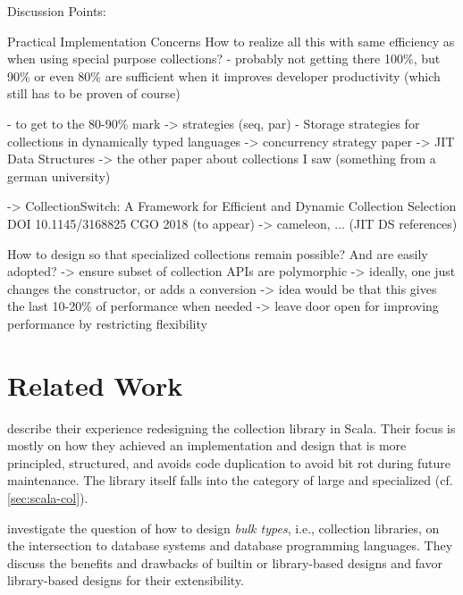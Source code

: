 \documentclass[sigconf, 10pt]{acmart}
\begin{document}
\begin{note}
Discussion Points:
 


Practical Implementation Concerns
 How to realize all this with same efficiency as when using special purpose
 collections?
 - probably not getting there 100\%, but 90\% or even 80\% are sufficient
   when it improves developer productivity (which still has to be proven of course)
  
 - to get to the 80-90\% mark
  -> strategies (seq, par)
   - Storage strategies for collections in dynamically typed languages \citep{Bolz:2013:SSC}
   -> concurrency strategy paper
  -> JIT Data Structures
     -> the other paper about collections I saw (something from a german university)

  -> CollectionSwitch: A Framework for Efficient and Dynamic Collection Selection
DOI 10.1145/3168825
CGO 2018 (to appear)
  -> cameleon, ... (JIT DS references)



How to design so that specialized collections remain possible?
And are easily adopted?
 -> ensure subset of collection APIs are polymorphic
   -> ideally, one just changes the constructor, or adds a conversion
   -> idea would be that this gives the last 10-20\% of performance when needed
   -> leave door open for improving performance by restricting flexibility
\end{note}




\section{Related Work}

\citet{Odersky:2009} describe their experience
redesigning the collection library in Scala.
Their focus is mostly on how they achieved an implementation and design
that is more principled, structured, and avoids code duplication
to avoid bit rot during future maintenance.
The library itself falls into the category of large and specialized (cf. \cref{sec:scala-col}). 

\citet{Matthes:2000:BT} investigate the question of how to design \emph{bulk types}, i.e., collection libraries, on the intersection to database systems and database programming languages.
They discuss the benefits and drawbacks of builtin or library-based designs and favor library-based designs for their extensibility.
\end{document}
